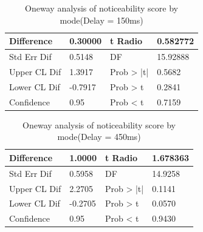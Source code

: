 \begin{table} [!htbp]
\begin{tabular}{|p{}|p{}|p{}|p{}|}
\hline 
Difference & 0.30000 & t Radio & 0.582772 \\
\hline
Std Err Dif & 0.5148 & DF & 15.92888 \\
\hline
Upper CL Dif & 1.3917 & Prob > |t| & 0.5682 \\
\hline
Lower CL Dif & -0.7917 & Prob > t & 0.2841 \\
\hline
Confidence & 0.95 & Prob < t & 0.7159 \\
\hline
\end{tabular}
\caption{Oneway analysis of noticeability score by mode(Delay = 150ms)}
\label{tab:table_questionnaire}
\end{table}


\begin{table} [!htbp]
\begin{tabular}{|p{}|p{}|p{}|p{}|}
\hline 
Difference & 1.0000 & t Radio & 1.678363 \\
\hline
Std Err Dif & 0.5958 & DF & 14.9258 \\
\hline
Upper CL Dif & 2.2705 & Prob > |t| & 0.1141 \\
\hline
Lower CL Dif & -0.2705 & Prob > t & 0.0570 \\
\hline
Confidence & 0.95 & Prob < t & 0.9430 \\
\hline
\end{tabular}
\caption{Oneway analysis of noticeability score by mode(Delay = 450ms)}
\label{tab:table_questionnaire}
\end{table}
